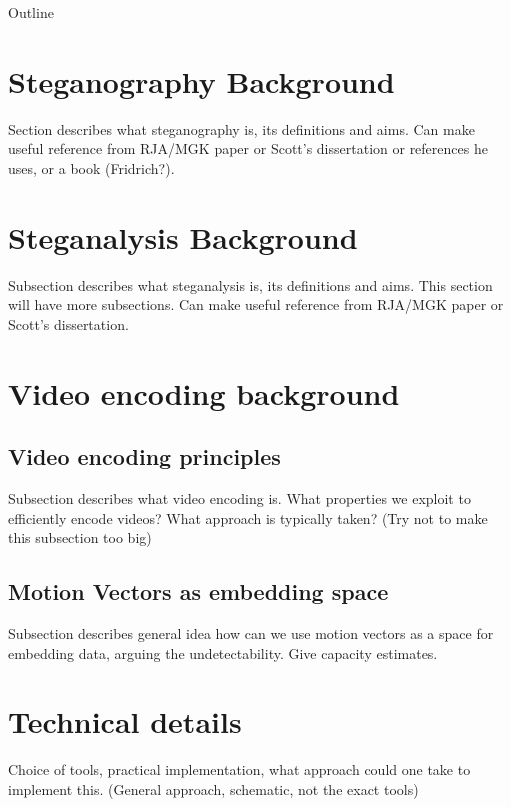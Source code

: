 \documentclass[12pt,british,twoside,notitlepage,usenames,dvipsnames,hypens,final]{report}
\numberwithin{equation}{section}
\numberwithin{figure}{section}
\begin{document}


Outline

\section{Steganography Background}

Section describes what steganography is, its definitions and aims. Can make useful reference from RJA/MGK paper or Scott's dissertation or references he uses, or a book (Fridrich?). 

\section{Steganalysis Background}

Subsection describes what steganalysis is, its definitions and aims. This section will have more subsections. Can make useful reference from RJA/MGK paper or Scott's dissertation. 

\section{Video encoding background}

\subsection{Video encoding principles}

Subsection describes what video encoding is. What properties we exploit to efficiently encode videos? What approach is typically taken? (Try not to make this subsection too big)

\subsection{Motion Vectors as embedding space}

Subsection describes general idea how can we use motion vectors as a space for embedding data, arguing the undetectability. Give capacity estimates.

\section{Technical details}

Choice of tools, practical implementation, what approach could one take to implement this. (General approach, schematic, not the exact tools)
\end{document}
